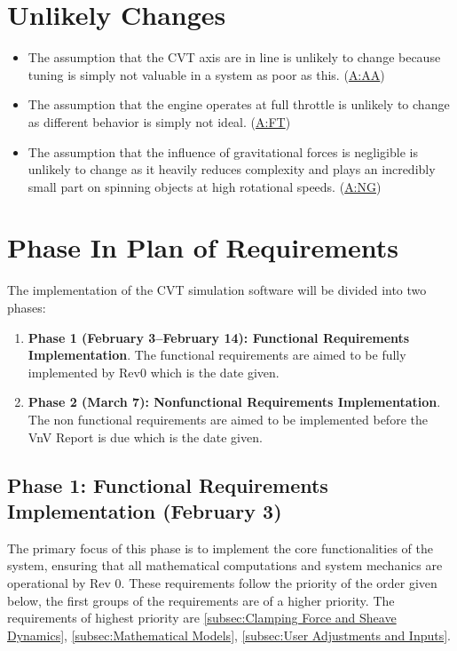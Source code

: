 \documentclass[12pt]{article}
\newcommand{\hpref}[1]{\hyperref[#1]{#1}}
\begin{document}
\section{Unlikely Changes}    

\begin{itemize}

  \item[ULC:AL \label{ULC:AL}:] The assumption that the CVT axis are in line is unlikely to change because tuning is simply not valuable in a system as poor as this. (\hpref{A:AA})
  \item[ULC:FT \label{ULC:FT}:] The assumption that the engine operates at full throttle is unlikely to change as different behavior is simply not ideal. (\hpref{A:FT})
  \item[ULC:GF \label{ULC:GF}:] The assumption that the influence of gravitational forces is negligible is unlikely to change as it heavily reduces complexity and plays an incredibly small part on spinning objects at high rotational speeds. (\hpref{A:NG})
  
  \end{itemize}

  \section{Phase In Plan of Requirements}

  The implementation of the CVT simulation software will be divided into two phases:
  \begin{enumerate}
      \item \textbf{Phase 1 (February 3–February 14): Functional Requirements Implementation}. The functional requirements are aimed to be fully implemented by Rev0 which is the date given. 
      \item \textbf{Phase 2 (March 7): Nonfunctional Requirements Implementation}. The non functional requirements are aimed to be implemented before the VnV Report is due which is the date given. 
  \end{enumerate}
  
  \subsection{Phase 1: Functional Requirements Implementation (February 3)}
  
  The primary focus of this phase is to implement the core functionalities of the system, ensuring that all mathematical computations and system mechanics are operational by Rev 0.
  These requirements follow the priority of the order given below, the first groups of the requirements are of a higher priority. 
  The requirements of highest priority are \ref{subsec:Clamping Force and Sheave Dynamics}, \ref{subsec:Mathematical Models}, \ref{subsec:User Adjustments and Inputs}. 
  
\end{document}
